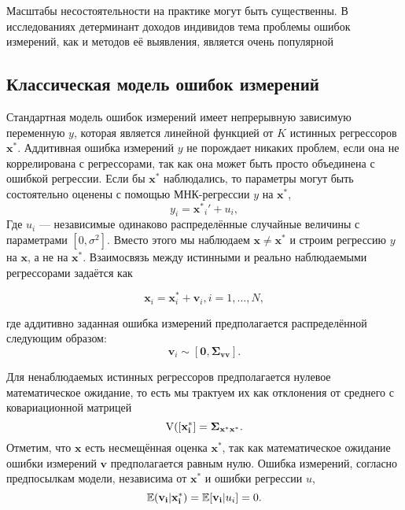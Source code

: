 Масштабы несостоятельности на практике могут быть существенны. В исследованиях детерминант доходов индивидов тема проблемы ошибок измерений, как и методов её выявления, является очень популярной

\subsection{Классическая модель ошибок измерений} 

Стандартная модель ошибок измерений имеет непрерывную зависимую переменную $y$, которая является линейной функцией от $K$ истинных регрессоров $\mathbf{x^*}$. Аддитивная ошибка измерений $y$ не порождает никаких проблем, если она не коррелирована с регрессорами, так как она может быть просто объединена с ошибкой регрессии. Если бы $\mathbf{x^*}$ наблюдались, то параметры могут быть состоятельно оценены с помощью МНК-регрессии $y$ на $\mathbf{x^*}$,
\[
y_i=\mathbf{x^*}_i'+u_i,
\]
Где $u_i$ --- независимые одинаково распределённые случайные величины с параметрами $[0,\sigma^2]$. Вместо этого мы наблюдаем $\mathbf{x}\neq \mathbf{x^*}$ и строим регрессию $y$ на $\mathbf{x}$, а не на $\mathbf{x^*}$. Взаимосвязь между истинными и реально наблюдаемыми регрессорами задаётся как

\begin{equation}
\mathbf{x}_i=\mathbf{x}_i^*+\mathbf{v}_i, i=1,\ldots,N,
\end{equation}

где аддитивно заданная ошибка измерений предполагается распределённой следующим образом:
\begin{equation}
\mathbf{v}_i \sim [\mathbf{0},\mathbf{\Sigma_{vv}}].
\end{equation}

Для ненаблюдаемых истинных регрессоров предполагается нулевое математическое ожидание, то есть мы трактуем их как отклонения от среднего с ковариационной матрицей 
\begin{equation}
\mathrm{V}\mathbf{([x^*_i]}=\mathbf{\Sigma_{x^*x^*}}.
\end{equation}
Отметим, что $\mathbf{x}$ есть несмещённая оценка $\mathbf{x^*}$, так как математическое ожидание ошибки измерений $\mathbf{v}$ предполагается равным нулю. Ошибка измерений, согласно предпосылкам модели, независима от $\mathbf{x^*}$ и ошибки регрессии $u$,
\begin{equation}
\mathbb{E}(\mathbf{v_i}|\mathbf{x^*_i})=\mathbb{E}[\mathbf{v_i}|u_i]=0.
\end{equation}

